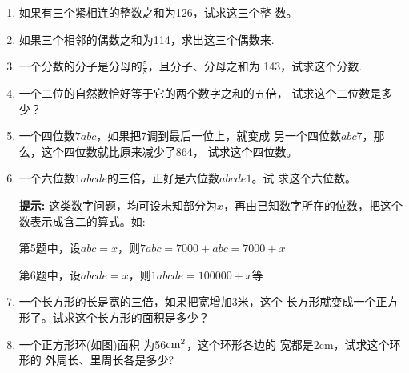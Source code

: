 \begin{enumerate}
    \item 如果有三个紧相连的整数之和为126，试求这三个整
    数。
    \item 如果三个相邻的偶数之和为114，求出这三个偶数来.
    \item 一个分数的分子是分母的$\frac{5}{8}$，且分子、分母之和为
    143，试求这个分数.
    \item 一个二位的自然数恰好等于它的两个数字之和的五倍，
    试求这个二位数是多少？
    \item 一个四位数$7abc$，如果把7调到最后一位上，就变成
    另一个四位数$abc7$，那么，这个四位数就比原来减少了864，
    试求这个四位数。
    \item 一个六位数$1abcde$的三倍，正好是六位数$abcde1$。试
    求这个六位数。
        
    \textbf{提示:} 这类数字问题，均可设未知部分为$x$，再由已知数字所在的位数，把这个数表示成含二的算式。如:

    第5题中，设$abc=x$，则$7abc=7000+abc = 7000+x$

    第6题中，设$abcde = x$，则$1abcde =100000 + x$等

 \item  一个长方形的长是宽的三倍，如果把宽增加3米，这个
 长方形就变成一个正方形了。试求这个长方形的面积是多少？
    
\item   一个正方形环(如图)面积
为56${\rm cm}^2$，这个环形各边的
宽都是2cm，试求这个环形的
外周长、里周长各是多少?

\begin{center}
\end{center}


\end{enumerate}
